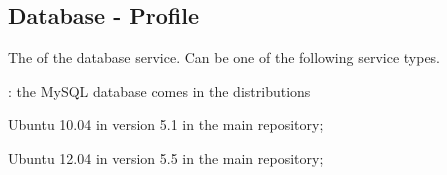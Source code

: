 \label{sec:database_profile}
\subsection{Database - Profile}


The  of the database service. Can be one of the following 
service types.
\begin{asparaitem}
%
\item[\qcode{mysql}:] 
the MySQL database comes in the distributions 
\begin{compactitem}
\item[\TheDistribution{ubuntu}] Ubuntu 10.04 in version 5.1 in the main repository;
\item[\TheDistribution{ubuntu}] Ubuntu 12.04 in version 5.5 in the main repository;
\end{compactitem}
%
\end{asparaitem}

